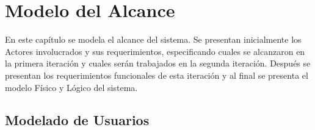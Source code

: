 \chapter{Modelo del Alcance}
\label{cap:reqUsr}

	En este capítulo se modela el alcance del sistema. Se presentan inicialmente los Actores involucrados y sus requerimientos, especificando cuales se alcanzaron en la primera iteración y cuales serán trabajados en la segunda iteración. Después se presentan los requerimientos funcionales de esta iteración y al final se presenta el modelo Físico y Lógico del sistema.


\section{Modelado de Usuarios}


